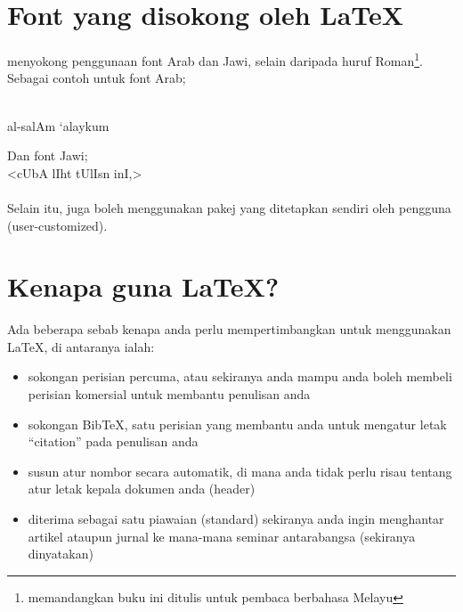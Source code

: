 \section{Font yang disokong oleh \LaTeX}
\label{sokongan}
\latex{} menyokong penggunaan font  Arab dan  Jawi, selain daripada huruf Roman\footnote{memandangkan buku ini ditulis untuk pembaca berbahasa Melayu}.
Sebagai contoh untuk font Arab;\\\\


\vocalize
\arabtrue
\begin{RLtext}
\large{
al-salAm `alaykum
}
\end{RLtext}

\hspace{1cm}

Dan font Jawi;\\

\novocalize
\setmalay
<cUbA lIht tUlIsn inI,>
{\color{blue}}
{\color{red}}\\\\

Selain itu, \latex{} juga boleh menggunakan pakej yang ditetapkan sendiri oleh pengguna (user-customized). 



\section{Kenapa guna \LaTeX?}
Ada beberapa sebab kenapa anda perlu mempertimbangkan untuk menggunakan \LaTeX{}, di antaranya ialah:

\begin{itemize}
\item sokongan perisian percuma, atau sekiranya anda mampu anda boleh membeli perisian komersial untuk membantu penulisan anda
\item sokongan Bib\TeX{}, satu perisian yang membantu anda untuk mengatur letak \mbox{``}citation\mbox{''} pada penulisan anda
\item susun atur nombor secara automatik, di mana anda tidak perlu risau tentang atur letak kepala dokumen anda (header)
\item diterima sebagai satu piawaian (standard) sekiranya anda ingin menghantar artikel ataupun jurnal ke mana-mana seminar antarabangsa (sekiranya dinyatakan)
\end{itemize}

